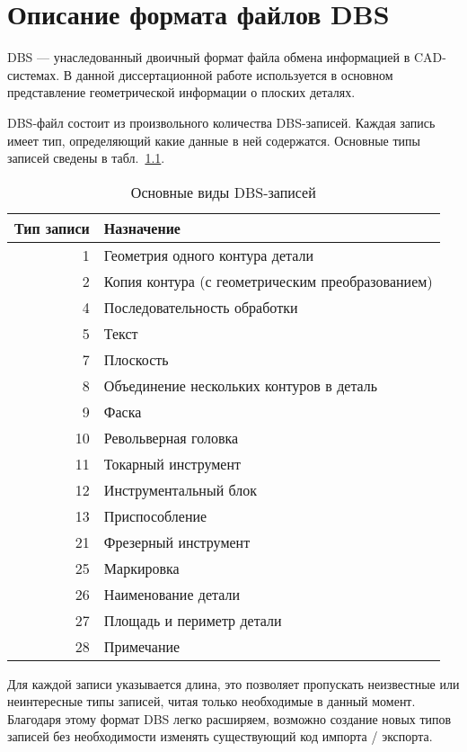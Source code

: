 
\chapter{
  Описание формата файлов DBS
}
\label{app:dbs}

DBS ---
унаследованный двоичный формат файла
обмена информацией в CAD-системах.
В данной диссертационной работе
используется в основном представление
геометрической информации о плоских деталях.

DBS-файл состоит из произвольного количества DBS-записей.
Каждая запись имеет тип, определяющий какие данные в ней содержатся.
Основные типы записей сведены в табл.~\ref{tab:dbs.records}.

\begin{table}[h]
  \caption{Основные виды DBS-записей}
  \label{tab:dbs.records}
  \centering
  \begin{tabular}{|r|l|}
    \hline
    Тип записи & Назначение \\
    \hline
    1  & Геометрия одного контура детали  \\
    2  & Копия контура (с геометрическим преобразованием) \\
    4  & Последовательность обработки \\
    5  & Текст  \\
    7  & Плоскость  \\
    8  & Объединение нескольких контуров в деталь \\
    9  & Фаска  \\
    10 & Револьверная головка \\
    11 & Токарный инструмент  \\
    12 & Инструментальный блок  \\
    13 & Приспособление \\
    21 & Фрезерный инструмент \\
    25 & Маркировка \\
    26 & Наименование детали  \\
    27 & Площадь и периметр детали  \\
    28 & Примечание \\
    \hline
  \end{tabular}
\end{table}

Для каждой записи указывается длина,
это позволяет пропускать неизвестные или
неинтересные типы записей,
читая только необходимые в данный момент.
Благодаря этому формат DBS
легко расширяем,
возможно создание новых типов записей
без необходимости изменять существующий
код импорта / экспорта.

